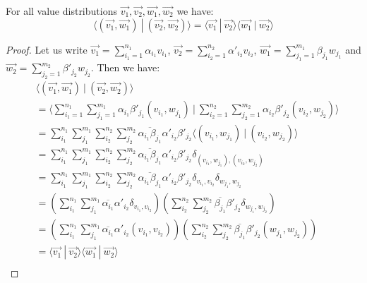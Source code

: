 \documentclass[runningheads,orivec,envcountsame,envcountsect]{llncs}
\def\scal#1#2{\langle{#1}~|~{#2}\rangle}
\def\Pair#1#2{(#1,#2)} %
\def\Kron#1#2{\ensuremath{\delta_{#1,#2}}}
\begin{document}
\begin{theorem}\label{prop:InnerProdPairs} For all value distributions $\vec{v_1}, \vec{v_2}, \vec{w_1}, \vec{w_2}$ we have:
\[
\scal{\Pair{\vec{v_1}}{\vec{w_1}}}{\Pair{\vec{v_2}}{\vec{w_2}}} = \scal{\vec{v_1}}{\vec{v_2}}\scal{\vec{w_1}}{\vec{w_2}}
\]
\begin{proof}
    Let us write $\vec{v_1}=\sum_{i_1=1}^{n_1}\alpha_{i_1} v_{i_1}$, $\vec{v_2}=\sum_{i_2=1}^{n_2}\alpha'_{i_2} v_{i_2}$, $\vec{w_1}=\sum_{j_1=1}^{m_1}\beta_{j_1} w_{j_1}$ and $\vec{w_2}=\sum_{j_2=1}^{m_2}\beta'_{j_2} w_{j_2}$. Then we have:
    \begin{align*}
        &\scal{\Pair{\vec{v_1}}{\vec{w_1}}}{\Pair{\vec{v_2}}{\vec{w_2}}}\\
        &=\scal{\sum_{i_1=1}^{n_1}\sum_{j_1=1}^{m_1} \alpha_{i_1}\beta'_{j_1}\Pair{v_{i_1}}{w_{j_1}}}{\sum_{i_2=1}^{n_2}\sum_{j_2=1}^{m_2} \alpha_{i_2}\beta'_{j_2}\Pair{v_{i_2}}{w_{j_2}}}\\
        &=\sum_{i_1}^{n_1}\sum_{j_1}^{m_1}\sum_{i_2}^{n_2}\sum_{j_2}^{m_2} \overline{\alpha_{i_1}\beta_{j_1}} \alpha'_{i_2}\beta'_{j_2} \scal{\Pair{v_{i_1}}{w_{j_1}}}{\Pair{v_{i_2}}{w_{j_2}}}\\
        &=\sum_{i_1}^{n_1}\sum_{j_1}^{m_1}\sum_{i_2}^{n_2}\sum_{j_2}^{m_2} \overline{\alpha_{i_1}\beta_{j_1}} \alpha'_{i_2}\beta'_{j_2} \Kron{\Pair{v_{i_1}}{w_{j_1}}}{\Pair{v_{i_2}}{w_{j_2}}}\\
        &=\sum_{i_1}^{n_1}\sum_{j_1}^{m_1}\sum_{i_2}^{n_2}\sum_{j_2}^{m_2} \overline{\alpha_{i_1}\beta_{j_1}} \alpha'_{i_2}\beta'_{j_2} \Kron{v_{i_1}}{v_{i_2}}\Kron{w_{j_1}}{w_{j_2}}\\
        &=(\sum_{i_1}^{n_1}\sum_{j_1}^{m_1}\overline{\alpha_{i_1}}\alpha'_{i_2}\Kron{v_{i_1}}{v_{i_2}})(\sum_{i_2}^{n_2}\sum_{j_2}^{m_2} \overline{\beta_{j_1}} \beta'_{j_2} \Kron{w_{j_1}}{w_{j_2}})\\
        &=(\sum_{i_1}^{n_1}\sum_{j_1}^{m_1}\overline{\alpha_{i_1}}\alpha'_{i_2}\Pair{v_{i_1}}{v_{i_2}})(\sum_{i_2}^{n_2}\sum_{j_2}^{m_2} \overline{\beta_{j_1}} \beta'_{j_2} \Pair{w_{j_1}}{w_{j_2}})\\
        &=\scal{\vec{v_1}}{\vec{v_2}}\scal{\vec{w_1}}{\vec{w_2}}\\
    \end{align*}
\end{proof}  

\end{theorem}
\end{document}
